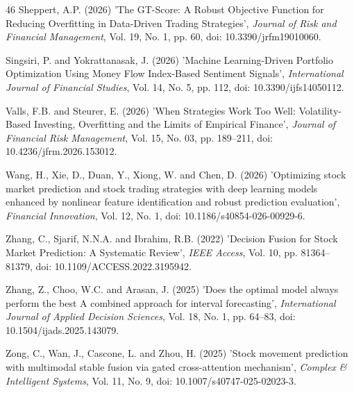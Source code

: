 \begin{thebibliography}{46}
Sheppert, A.P. (2026) 'The GT-Score: A Robust Objective Function for Reducing Overfitting in Data-Driven Trading Strategies', {\it Journal of Risk and Financial Management}, Vol. 19, No. 1, pp. 60, doi: 10.3390/jrfm19010060.

Singsiri, P. and Yokrattanasak, J. (2026) 'Machine Learning-Driven Portfolio Optimization Using Money Flow Index-Based Sentiment Signals', {\it International Journal of Financial Studies}, Vol. 14, No. 5, pp. 112, doi: 10.3390/ijfs14050112.

Valls, F.B. and Steurer, E. (2026) 'When Strategies Work Too Well: Volatility-Based Investing, Overfitting and the Limits of Empirical Finance', {\it Journal of Financial Risk Management}, Vol. 15, No. 03, pp. 189--211, doi: 10.4236/jfrm.2026.153012.

Wang, H., Xie, D., Duan, Y., Xiong, W. and Chen, D. (2026) 'Optimizing stock market prediction and stock trading strategies with deep learning models enhanced by nonlinear feature identification and robust prediction evaluation', {\it Financial Innovation}, Vol. 12, No. 1, doi: 10.1186/s40854-026-00929-6.

Zhang, C., Sjarif, N.N.A. and Ibrahim, R.B. (2022) 'Decision Fusion for Stock Market Prediction: A Systematic Review', {\it IEEE Access}, Vol. 10, pp. 81364--81379, doi: 10.1109/ACCESS.2022.3195942.

Zhang, Z., Choo, W.C. and Arasan, J. (2025) 'Does the optimal model always perform the best A combined approach for interval forecasting', {\it International Journal of Applied Decision Sciences}, Vol. 18, No. 1, pp. 64--83, doi: 10.1504/ijads.2025.143079.

Zong, C., Wan, J., Cascone, L. and Zhou, H. (2025) 'Stock movement prediction with multimodal stable fusion via gated cross-attention mechanism', {\it Complex \& Intelligent Systems}, Vol. 11, No. 9, doi: 10.1007/s40747-025-02023-3.

\end{thebibliography}
